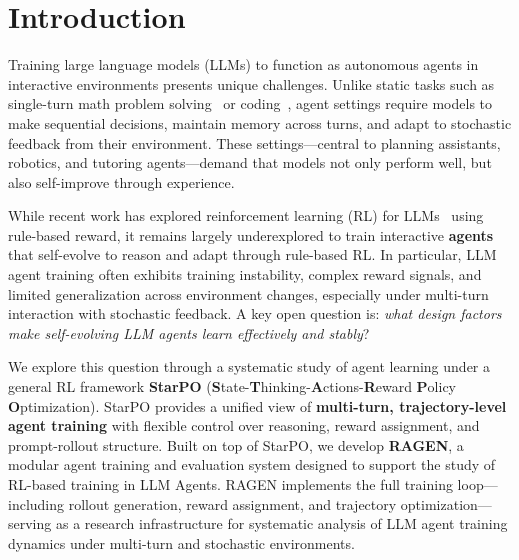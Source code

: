 

\section{Introduction}

Training large language models (LLMs) to function as autonomous agents in interactive environments presents unique challenges. Unlike static tasks such as single-turn math problem solving~\citep{shao2024deepseekmathpushinglimitsmathematical} or coding~\citep{deepseekai2024deepseekcoderv2breakingbarrierclosedsource}, agent settings require models to make sequential decisions, maintain memory across turns, and adapt to stochastic feedback from their environment. These settings—central to planning assistants, robotics, and tutoring agents—demand that models not only perform well, but also self-improve through experience.

While recent work has explored reinforcement learning (RL) for LLMs~\citep{deepseekai2025deepseekr1incentivizingreasoningcapability, openai2024o1, tinyzero, zeng2025simplerl, kumar2024traininglanguagemodelsselfcorrect, gao2024regressingrelativefutureefficient} using rule-based reward, it remains largely underexplored to train interactive \textbf{agents} that self-evolve to reason and adapt through rule-based RL. In particular, LLM agent training often exhibits training instability, complex reward signals, and limited generalization across environment changes, especially under multi-turn interaction with stochastic feedback. A key open question is: \textit{what design factors make self-evolving LLM agents learn effectively and stably}?


We explore this question through a systematic study of agent learning under a general RL framework \textbf{StarPO} (\textbf{S}tate-\textbf{T}hinking-\textbf{A}ctions-\textbf{R}eward \textbf{P}olicy \textbf{O}ptimization). StarPO provides a unified view of \textbf{multi-turn, trajectory-level agent training} with flexible control over reasoning, reward assignment, and prompt-rollout structure. Built on top of StarPO, we develop \textbf{RAGEN}, a modular agent training and evaluation system designed to support the study of RL-based training in LLM Agents. RAGEN implements the full training loop—including rollout generation, reward assignment, and trajectory optimization—serving as a research infrastructure for systematic analysis of LLM agent training dynamics under multi-turn and stochastic environments.

